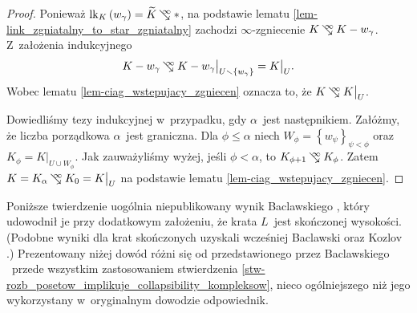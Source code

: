 \begin{proof}
Ponieważ $\lk_K\left(w_\gamma\right)=\widetilde{K}\infcoll*$, na podstawie lematu \ref{lem-link_zgniatalny_to_star_zgniatalny} zachodzi \mbox{$\infty$-zgniecenie} $K\infcoll K-w_\gamma$. Z~założenia indukcyjnego \[K-w_\gamma\infcoll K-w_\gamma\big|_{U\smallsetminus \left\{w_\gamma\right\}}=K\big|_U.\] Wobec lematu \ref{lem-ciag_wstepujacy_zgniecen} oznacza to, że $K\infcoll K\big|_U$.

Dowiedliśmy tezy indukcyjnej w~przypadku, gdy $\alpha$~jest następnikiem. Załóżmy, że liczba porządkowa $\alpha$~jest graniczna. Dla $\phi\leq \alpha$ niech $W_\phi=\left\{w_\psi\right\}_{\psi<\phi}$ oraz $K_\phi=K\big|_{U\cup W_\phi}$. Jak zauważyliśmy wyżej, jeśli $\phi<\alpha$, to $K_{\phi+1}\infcoll K_\phi$. Zatem $K=K_\alpha\infcoll K_0=K\big|_U$ na podstawie lematu \ref{lem-ciag_wstepujacy_zgniecen}.
\end{proof}

Poniższe twierdzenie uogólnia niepublikowany wynik Baclawskiego \cite[Theorem 9.1]{Baclawski}, który udowodnił je przy dodatkowym założeniu, że krata $L$~jest skończonej wysokości. (Podobne wyniki dla krat skończonych uzyskali wcześniej Baclawski \cite[Theorem 26]{Baclawski12} oraz Kozlov \cite[Theorem 2.4]{Kozlov98}.) Prezentowany niżej dowód różni się od przedstawionego przez Baclawskiego \cite{Baclawski}~przede wszystkim zastosowaniem stwierdzenia \ref{stw-rozb_posetow_implikuje_collapsibility_kompleksow}, nieco ogólniejszego niż jego wykorzystany w~oryginalnym dowodzie odpowiednik.

